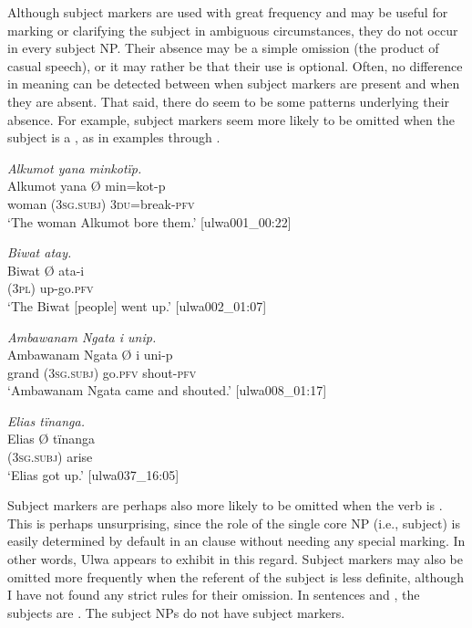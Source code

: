 Although subject markers are used with great frequency and may be useful for marking  or clarifying the subject in ambiguous circumstances, they do not occur in every subject NP. Their absence may be a simple omission (the product of casual speech), or it may rather be that their use is optional. Often, no difference in meaning can be detected between when subject markers are present and when they are absent. That said, there do seem to be some patterns underlying their absence. For example, subject markers seem more likely to be omitted when the subject is a , as in examples  through .

\ea%
    \label{ex:det:23bis}
          \textit{Alkumot yana minkotïp.}\\
\gll    Alkumot  yana    Ø      min=kot-p\\
    [name]    woman    (\textsc{3sg.subj)}  \textsc{3du=}break-\textsc{pfv}\\
\glt `The woman Alkumot bore them.’ [ulwa001\_00:22]
\z

\ea%
    \label{ex:det:24bis}
          \textit{Biwat atay.}\\
\gll    Biwat  Ø    ata-i\\
    [place]  (\textsc{3pl)}  up-go.\textsc{pfv}\\
\glt `The Biwat [people] went up.’ [ulwa002\_01:07]
\z

\ea%
    \label{ex:det:25bis}
          \textit{Ambawanam Ngata i unip.}\\
\gll    Ambawanam  Ngata  Ø      i    uni-p\\
    [name]      grand  (\textsc{3sg.subj)}  go.\textsc{pfv}  shout-\textsc{pfv}\\
\glt `Ambawanam Ngata came and shouted.’ [ulwa008\_01:17]
\z

\ea%
    \label{ex:det:26}
          \textit{Elias tïnanga.}\\
\gll    Elias  Ø      tïnanga\\
    [name]  (\textsc{3sg.subj)}  arise\\
\glt `Elias got up.’ [ulwa037\_16:05]
\z

Subject markers are perhaps also more likely to be omitted when the verb is . This is perhaps unsurprising, since the role of the single core NP (i.e., subject) is easily determined by default in an  clause without needing any special marking. In other words, Ulwa appears to exhibit  in this regard. Subject markers may also be omitted more frequently when the referent of the subject is less definite, although I have not found any strict rules for their omission. In sentences  and , the subjects are . The subject NPs do not have subject markers.

